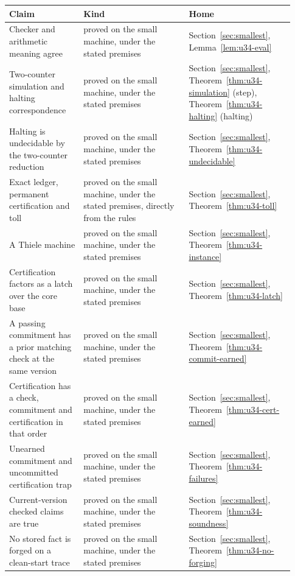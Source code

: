 \documentclass[11pt,twoside]{article}
\theoremstyle{thielethm}
\theoremstyle{thieledef}
\theoremstyle{thieledef}
\theoremstyle{thieledef}
\theoremstyle{thielethm}
\theoremstyle{thieleobs}
\theoremstyle{thielethm}
\begin{document}
\begingroup\small
\begin{longtable}{@{}>{\raggedright\arraybackslash}p{0.242\linewidth}>{\raggedright\arraybackslash}p{0.344\linewidth}>{\raggedright\arraybackslash}p{0.344\linewidth}@{}}
\toprule
\textbf{Claim} & \textbf{Kind} & \textbf{Home} \\
\midrule
\endhead
\bottomrule
\endlastfoot
Checker and arithmetic meaning agree & proved on the small machine, under the stated premises & Section~\ref{sec:smallest}, Lemma~\ref{lem:u34-eval} \\
Two-counter simulation and halting correspondence & proved on the small machine, under the stated premises & Section~\ref{sec:smallest}, Theorem~\ref{thm:u34-simulation} (step), Theorem~\ref{thm:u34-halting} (halting) \\
Halting is undecidable by the two-counter reduction & proved on the small machine, under the stated premises & Section~\ref{sec:smallest}, Theorem~\ref{thm:u34-undecidable} \\
Exact ledger, permanent certification and toll & proved on the small machine, under the stated premises, directly from the rules & Section~\ref{sec:smallest}, Theorem~\ref{thm:u34-toll} \\
A Thiele machine & proved on the small machine, under the stated premises & Section~\ref{sec:smallest}, Theorem~\ref{thm:u34-instance} \\
Certification factors as a latch over the core base & proved on the small machine, under the stated premises & Section~\ref{sec:smallest}, Theorem~\ref{thm:u34-latch} \\
A passing commitment has a prior matching check at the same version & proved on the small machine, under the stated premises & Section~\ref{sec:smallest}, Theorem~\ref{thm:u34-commit-earned} \\
Certification has a check, commitment and certification in that order & proved on the small machine, under the stated premises & Section~\ref{sec:smallest}, Theorem~\ref{thm:u34-cert-earned} \\
Unearned commitment and uncommitted certification trap & proved on the small machine, under the stated premises & Section~\ref{sec:smallest}, Theorem~\ref{thm:u34-failures} \\
Current-version checked claims are true & proved on the small machine, under the stated premises & Section~\ref{sec:smallest}, Theorem~\ref{thm:u34-soundness} \\
No stored fact is forged on a clean-start trace & proved on the small machine, under the stated premises & Section~\ref{sec:smallest}, Theorem~\ref{thm:u34-no-forging} \\

\end{longtable}
\end{document}
